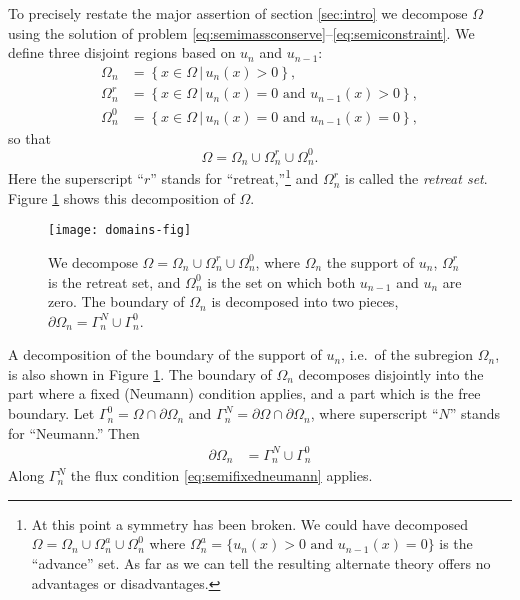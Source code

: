 \documentclass[final,leqno,onefignum,onetabnum]{siamltex1213bueler}
\begin{document}
To precisely restate the major assertion of section \ref{sec:intro} we decompose $\Omega$ using the solution of problem \eqref{eq:semimassconserve}--\eqref{eq:semiconstraint}.   We define three disjoint regions based on $u_n$ and $u_{n-1}$:
\begin{align*}
\Omega_n &= \left\{x \in \Omega \,\big|\, u_n(x)>0\right\}, \\
\Omega_n^r &= \left\{x \in \Omega \,\big|\, u_n(x)=0 \text{ and } u_{n-1}(x) > 0\right\}, \\
\Omega_n^0 &= \left\{x \in \Omega \,\big|\, u_n(x)=0 \text{ and } u_{n-1}(x) = 0\right\},
\end{align*}
so that
\begin{equation}
\Omega = \Omega_n \cup \Omega_n^r \cup \Omega_n^0.  \label{eq:omegadecomposition}
\end{equation}
Here the superscript ``$r$'' stands for ``retreat,''\footnote{At this point a symmetry has been broken.  We could have decomposed $\Omega= \Omega_n \cup \Omega_n^a \cup \Omega_n^0$ where $\Omega_n^a = \{u_n(x) > 0 \text{ and } u_{n-1}(x) = 0\}$ is the ``advance'' set.  As far as we can tell the resulting alternate theory offers no advantages or disadvantages.} and $\Omega_n^r$ is called the \emph{retreat set}.  Figure \ref{fig:domains} shows this decomposition of $\Omega$.

\begin{figure}[ht]
\begin{center}
\texttt{[image: domains-fig]}
\end{center}
\caption{We decompose $\Omega = \Omega_n \cup \Omega_n^r \cup \Omega_n^0$, where $\Omega_n$ the support of $u_n$, $\Omega_n^r$ is the retreat set, and $\Omega_n^0$ is the set on which both $u_{n-1}$ and $u_n$ are zero.  The boundary of $\Omega_n$ is decomposed into two pieces, $\partial\Omega_n = \Gamma_n^N \cup \Gamma_n^0$.}
\label{fig:domains}
\end{figure}

A decomposition of the boundary of the support of $u_n$, i.e.~of the subregion $\Omega_n$, is also shown in Figure \ref{fig:domains}.  The boundary of $\Omega_n$ decomposes disjointly into the part where a fixed (Neumann) condition applies, and a part which is the free boundary.  Let $\Gamma_n^0 = \Omega \cap \partial \Omega_n$ and $\Gamma_n^N = \partial \Omega \cap \partial \Omega_n$, where superscript ``$N$'' stands for ``Neumann.''  Then
\begin{align*}
\partial\Omega_n &= \Gamma_n^N \cup \Gamma_n^0
\end{align*}
Along $\Gamma_n^N$ the flux condition \eqref{eq:semifixedneumann} applies.
\end{document}
